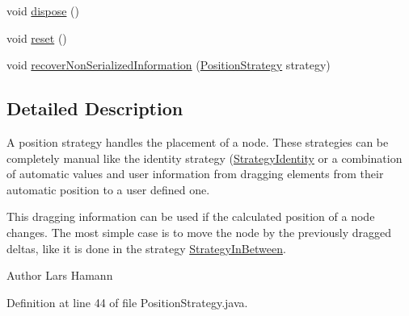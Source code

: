 \begin{DoxyCompactItemize}
\item 
void \hyperlink{interfaceorg_1_1tzi_1_1use_1_1gui_1_1views_1_1diagrams_1_1elements_1_1positioning_1_1_position_strategy_af9a301c4f5f3d6445657d0180aa2a686}{dispose} ()
\item 
void \hyperlink{interfaceorg_1_1tzi_1_1use_1_1gui_1_1views_1_1diagrams_1_1elements_1_1positioning_1_1_position_strategy_a67473d97d2d3a23de1e1aeb69875278a}{reset} ()
\item 
void \hyperlink{interfaceorg_1_1tzi_1_1use_1_1gui_1_1views_1_1diagrams_1_1elements_1_1positioning_1_1_position_strategy_a0b29d4840b6f672bd6548845e57be73c}{recover\-Non\-Serialized\-Information} (\hyperlink{interfaceorg_1_1tzi_1_1use_1_1gui_1_1views_1_1diagrams_1_1elements_1_1positioning_1_1_position_strategy}{Position\-Strategy} strategy)
\end{DoxyCompactItemize}


\subsection{Detailed Description}
A position strategy handles the placement of a node. These strategies can be completely manual like the identity strategy (\hyperlink{classorg_1_1tzi_1_1use_1_1gui_1_1views_1_1diagrams_1_1elements_1_1positioning_1_1_strategy_identity}{Strategy\-Identity} or a combination of automatic values and user information from dragging elements from their automatic position to a user defined one.

This dragging information can be used if the calculated position of a node changes. The most simple case is to move the node by the previously dragged deltas, like it is done in the strategy \hyperlink{classorg_1_1tzi_1_1use_1_1gui_1_1views_1_1diagrams_1_1elements_1_1positioning_1_1_strategy_in_between}{Strategy\-In\-Between}.

\begin{DoxyAuthor}{Author}
Lars Hamann 
\end{DoxyAuthor}


Definition at line 44 of file Position\-Strategy.\-java.



